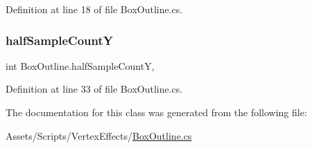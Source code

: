 Definition at line 18 of file Box\+Outline.\+cs.

\mbox{\label{class_box_outline_a9c6dcbe45e4be7b977a063ffdcdc851e}} 
\subsubsection{\texorpdfstring{half\+Sample\+CountY}{halfSampleCountY}}
{\footnotesize\ttfamily int Box\+Outline.\+half\+Sample\+CountY\hspace{0.3cm}{\ttfamily [get]}, {\ttfamily [set]}}



Definition at line 33 of file Box\+Outline.\+cs.



The documentation for this class was generated from the following file\+:\begin{DoxyCompactItemize}
\item 
Assets/\+Scripts/\+Vertex\+Effects/\mbox{\hyperlink{_box_outline_8cs}{Box\+Outline.\+cs}}\end{DoxyCompactItemize}
